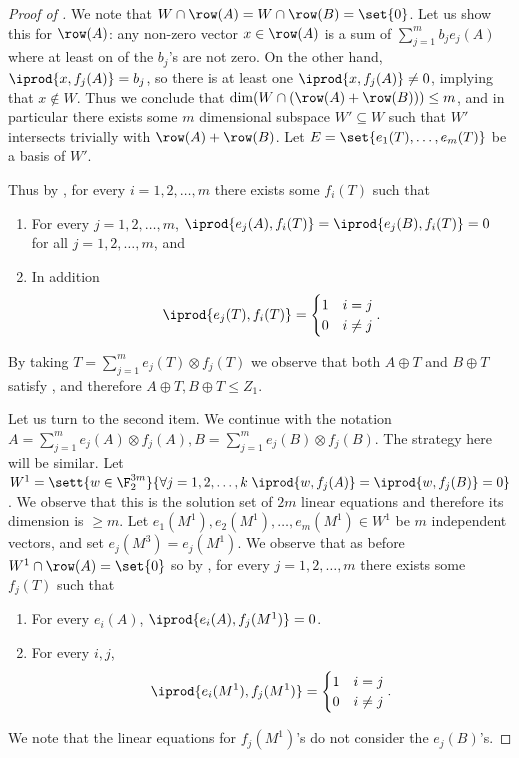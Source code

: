 \begin{proof}[Proof of ]
    We note that \(W \cap \row(A)=W \cap \row(B) = \set{0}\). Let us show this for \(\row(A)\): any non-zero vector \(x\in \row(A)\) is a sum of \(\sum_{j=1}^{m} b_j e_j(A)\) where at least on of the \(b_j\)'s are not zero. On the other hand, \(\iprod{x,f_j(A)} = b_j\), so there is at least one \(\iprod{x,f_j(A)} \ne 0\), implying that \(x \notin W\). Thus we conclude that \(\dim(W \cap (\row(A) + \row(B))) \leq m\), and in particular there exists some \(m\) dimensional subspace \(W' \subseteq W\) such that \(W'\) intersects trivially with \(\row(A) + \row(B)\). Let \(E = \set{e_1(T),\dots,e_{m}(T)}\) be a basis of \(W'\).

    Thus by , for every \(i=1,2,\dots,m\) there exists some \(f_i(T)\) such that 
    \begin{enumerate}
        \item For every \(j=1,2,\dots,m\), \(\iprod{e_j(A),f_i(T)} = \iprod{e_j(B),f_i(T)} = 0\) for all \(j=1,2,\dots,m\), and
        \item In addition
        \[\iprod{e_j(T),f_i(T)} = \begin{cases}
        1 & i=j \\ 0 & i \ne j
    \end{cases}.\]
    \end{enumerate} 
    By taking \(T = \sum_{j=1}^{m} e_j(T) \otimes f_j(T)\) we observe that both \(A \oplus T\) and \(B \oplus T\) satisfy , and therefore \(A \oplus T, B \oplus T \leq Z_1\).
    
    \medskip
    
    Let us turn to the second item. We continue with the notation \(A = \sum_{j=1}^{m} e_j(A) \otimes f_j(A), B=\sum_{j=1}^{m}e_j(B) \otimes f_j(B)\). The strategy here will be similar. Let \(W^1 = \sett{w \in \F_2^{3m}}{\forall j=1,2,\dots,k \; \iprod{w,f_j(A)}=\iprod{w,f_j(B)}=0}\). We observe that this is the solution set of \(2m\) linear equations and therefore its dimension is \(\geq m\). Let \(e_1(M^{1}),e_2(M^{1}),\dots,e_{m}(M^{1}) \in W^1\) be \(m\) independent vectors, and set \(e_j(M^3)=e_j(M^1)\). We observe that as before \(W^1 \cap \row(A) = \set{0}\) so by , for every \(j=1,2,\dots,m\) there exists some \(f_j(T)\) such that
    \begin{enumerate}
        \item For every \(e_i(A)\), \(\iprod{e_i(A),f_j(M^1)}=0\).
        \item For every \(i,j\), \[\iprod{e_i(M^1),f_j(M^1)} = \begin{cases}
        1 & i=j \\ 0 & i \ne j
    \end{cases}.\]
    \end{enumerate}
    We note that the linear equations for \(f_j(M^1)\)'s do not consider the \(e_j(B)\)'s. 
    

\end{proof}
